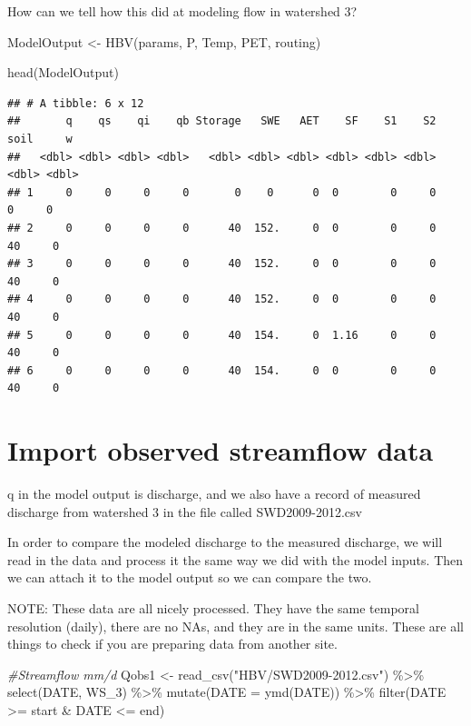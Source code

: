 \documentclass[
]{book}
\newenvironment{Shaded}{\begin{snugshade}}{\end{snugshade}}
\newcommand{\AttributeTok}[1]{\textcolor[rgb]{0.77,0.63,0.00}{#1}}
\newcommand{\CommentTok}[1]{\textcolor[rgb]{0.56,0.35,0.01}{\textit{#1}}}
\newcommand{\FunctionTok}[1]{\textcolor[rgb]{0.00,0.00,0.00}{#1}}
\newcommand{\NormalTok}[1]{#1}
\newcommand{\OtherTok}[1]{\textcolor[rgb]{0.56,0.35,0.01}{#1}}
\newcommand{\SpecialCharTok}[1]{\textcolor[rgb]{0.00,0.00,0.00}{#1}}
\newcommand{\StringTok}[1]{\textcolor[rgb]{0.31,0.60,0.02}{#1}}
\begin{document}
How can we tell how this did at modeling flow in watershed 3?

\begin{Shaded}
\begin{Highlighting}[]
\NormalTok{ModelOutput }\OtherTok{\textless{}{-}} \FunctionTok{HBV}\NormalTok{(params, P, Temp, PET, routing)}

\FunctionTok{head}\NormalTok{(ModelOutput)}
\end{Highlighting}
\end{Shaded}

\begin{verbatim}
## # A tibble: 6 x 12
##       q    qs    qi    qb Storage   SWE   AET    SF    S1    S2  soil     w
##   <dbl> <dbl> <dbl> <dbl>   <dbl> <dbl> <dbl> <dbl> <dbl> <dbl> <dbl> <dbl>
## 1     0     0     0     0       0    0      0  0        0     0     0     0
## 2     0     0     0     0      40  152.     0  0        0     0    40     0
## 3     0     0     0     0      40  152.     0  0        0     0    40     0
## 4     0     0     0     0      40  152.     0  0        0     0    40     0
## 5     0     0     0     0      40  154.     0  1.16     0     0    40     0
## 6     0     0     0     0      40  154.     0  0        0     0    40     0
\end{verbatim}

\hypertarget{import-observed-streamflow-data}{%
\section{Import observed streamflow data}\label{import-observed-streamflow-data}}

q in the model output is discharge, and we also have a record of measured discharge from watershed 3 in the file called SWD2009-2012.csv

In order to compare the modeled discharge to the measured discharge, we will read in the data and process it the same way we did with the model inputs. Then we can attach it to the model output so we can compare the two.

NOTE: These data are all nicely processed. They have the same temporal resolution (daily), there are no NAs, and they are in the same units. These are all things to check if you are preparing data from another site.

\begin{Shaded}
\begin{Highlighting}[]
\CommentTok{\#Streamflow mm/d}
\NormalTok{Qobs1 }\OtherTok{\textless{}{-}} \FunctionTok{read\_csv}\NormalTok{(}\StringTok{"HBV/SWD2009{-}2012.csv"}\NormalTok{) }\SpecialCharTok{\%\textgreater{}\%}
         \FunctionTok{select}\NormalTok{(DATE, WS\_3) }\SpecialCharTok{\%\textgreater{}\%}
         \FunctionTok{mutate}\NormalTok{(}\AttributeTok{DATE =} \FunctionTok{ymd}\NormalTok{(DATE)) }\SpecialCharTok{\%\textgreater{}\%}
         \FunctionTok{filter}\NormalTok{(DATE }\SpecialCharTok{\textgreater{}=}\NormalTok{ start }\SpecialCharTok{\&}\NormalTok{ DATE }\SpecialCharTok{\textless{}=}\NormalTok{ end)}
\end{Highlighting}
\end{Shaded}
\end{document}
